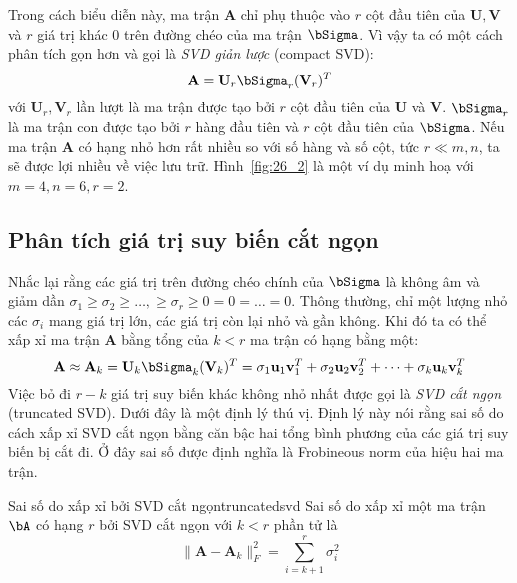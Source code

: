 Trong cách biểu diễn này, ma trận $\mathbf{A}$ chỉ phụ thuộc vào $r$ cột
đầu tiên của $\mathbf{U, V}$ và $r$ giá trị khác 0 trên đường chéo của ma trận
$\bSigma$. Vì vậy ta có một cách phân tích {gọn} hơn và gọi là \textit{SVD giản lược} (compact SVD):
\begin{equation} 
\mathbf{A} = {\mathbf{U}}_r{\bSigma}_r({\mathbf{V}}_r)^T 
\end{equation} 
với $\mathbf{U}_r, \mathbf{V}_r $ lần lượt là ma trận được tạo bởi $r$ cột đầu
tiên của $\mathbf{U}$ và $\mathbf{V}$. $\bSigma_r$ là ma trận con được tạo bởi
$r$ hàng đầu tiên và $r$ cột đầu tiên của $\bSigma$. Nếu ma trận $\mathbf{A}$ có
hạng nhỏ hơn rất nhiều so với số hàng và số cột, tức $r \ll m, n$, ta sẽ được lợi
nhiều về việc lưu trữ. Hình~\ref{fig:26_2} là một ví dụ minh hoạ với $m = 4, n = 6, r = 2$. 
 

\subsection{Phân tích giá trị suy biến cắt ngọn}
Nhắc lại rằng các giá trị trên đường chéo chính của $\bSigma$ là không âm
và giảm dần $\sigma_1 \geq \sigma_2 \geq \dots, \geq \sigma_r \geq 0 = 0 = \dots
= 0$. Thông thường, chỉ một lượng nhỏ các $\sigma_i$ mang giá trị lớn, các giá
trị còn lại nhỏ và gần không. Khi đó ta có thể xấp xỉ ma trận $\mathbf{A}$
bằng tổng của $k < r$ ma trận có hạng bằng một:
\begin{equation} 
\mathbf{A} \approx \mathbf{A}_k = \mathbf{U}_k \bSigma_k (\mathbf{V}_k)^T = \sigma_1 \mathbf{u}_1 \mathbf{v}^T_1 + \sigma_2\mathbf{u}_2\mathbf{v}_2^T + \dots + \sigma_k\mathbf{u}_k\mathbf{v}_k^T  
\end{equation} 
Việc bỏ đi $r-k$ giá trị suy biến khác không nhỏ nhất được gọi là \textit{SVD cắt ngọn} (truncated SVD). Dưới đây là một định lý thú vị. Định lý này nói rằng sai số do cách xấp xỉ SVD cắt ngọn bằng căn bậc hai tổng bình phương của các giá trị suy biến bị cắt đi. Ở đây sai số được định nghĩa là Frobineous norm của
hiệu hai ma trận.
\begin{mytheo}{Sai số do xấp xỉ bởi SVD cắt ngọn}{truncatedsvd}
Sai số do xấp xỉ một ma trận $\bA$ có hạng $r$ bởi SVD cắt ngọn với $k < r$ phần tử là 
\begin{equation} 
\|\mathbf{A} - \mathbf{A}_k\|_F^2 = \sum_{i = k + 1}^r \sigma_i^2 
\end{equation} 
\end{mytheo}

